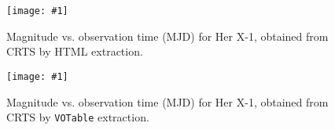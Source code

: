 \documentclass{article}
\theoremstyle{definition}
\newcommand{\plop}[2]{
    \begin{figure}[ht!]\centering
        \texttt{[image: \#1]}
        \caption{\label{#1}#2}
    \end{figure}
}
\begin{document}
\plop{fig1.pdf}{Magnitude vs. observation time (MJD) for Her X-1, obtained
from CRTS by HTML extraction.}
\plop{fig2.pdf}{Magnitude vs. observation time (MJD) for Her X-1, obtained
from CRTS by \texttt{VOTable} extraction.}
\end{document}
